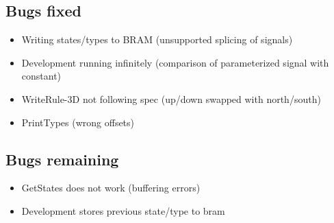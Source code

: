 \subsection{Bugs fixed}

\begin{itemize}
    \item Writing states/types to BRAM (unsupported splicing of signals)
    \item Development running infinitely (comparison of parameterized signal with constant)
    \item WriteRule-3D not following spec (up/down swapped with north/south)
    \item PrintTypes (wrong offsets)
\end{itemize}

\subsection{Bugs remaining}

\begin{itemize}
    \item GetStates does not work (buffering errors)
    \item Development stores previous state/type to bram
\end{itemize}

